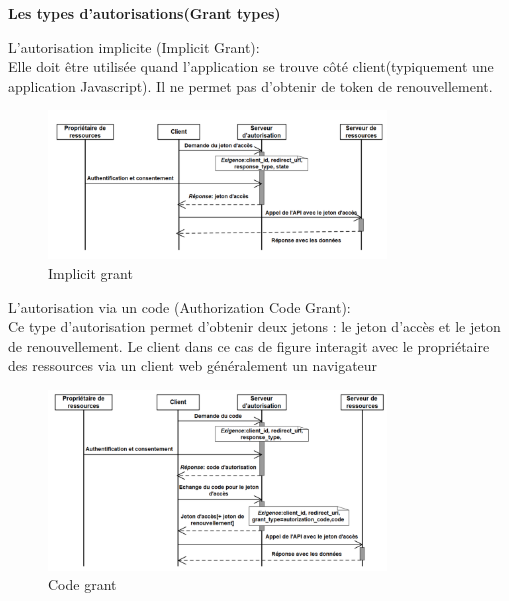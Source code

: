 \textbf{Les types d’autorisations(Grant types)}

\begin{list}{•}
	\item L’autorisation implicite (Implicit Grant): \\
	Elle doit être utilisée quand l’application se trouve côté
	client(typiquement une application Javascript). Il ne permet pas d’obtenir de token de renouvellement.
	
	\begin{figure}[H]
            \centering
                \includegraphics[width=0.8\textwidth]{Figures/implicit_grant}
	       \decoRule
		\caption[Implicit grant]{Implicit grant}
	\label{fig:implicit}
	\end{figure}
	\newpage
	\item L’autorisation via un code (Authorization Code Grant): \\
	Ce type d’autorisation permet d’obtenir deux jetons : le jeton d’accès et le jeton de renouvellement. Le client dans ce cas de figure interagit
	avec le propriétaire des ressources via un client web généralement un navigateur
	\begin{figure}[H]
            \centering
                \includegraphics[width=0.8\textwidth]{Figures/code_grant}
	       \decoRule
		\caption[Code grant]{Code grant}
	\label{fig:Code}
	\end{figure}
	

\end{list}
